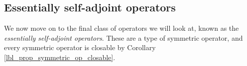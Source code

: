 %
%

\subsection{Essentially self-adjoint operators}
We now move on to the final class of operators we will look at, known as the {\emph{essentially self-adjoint operators}}. These are a type of symmetric operator, and every symmetric operator is closable by Corollary \eqref{lbl_prop_symmetric_op_closable}.

